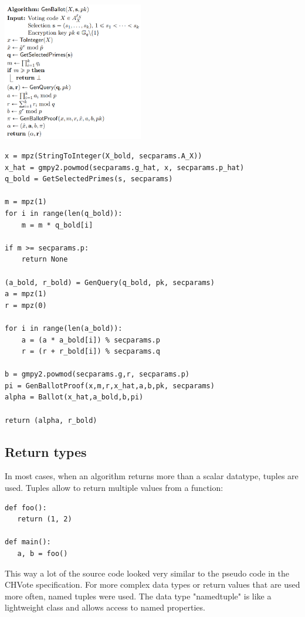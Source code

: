 \begin{multicols}{2}
\includegraphics[width=0.46\textwidth]{assets/genballot.png}
\columnbreak
\begin{verbatim}
x = mpz(StringToInteger(X_bold, secparams.A_X))
x_hat = gmpy2.powmod(secparams.g_hat, x, secparams.p_hat)
q_bold = GetSelectedPrimes(s, secparams)

m = mpz(1)
for i in range(len(q_bold)):
    m = m * q_bold[i]

if m >= secparams.p:
    return None

(a_bold, r_bold) = GenQuery(q_bold, pk, secparams)
a = mpz(1)
r = mpz(0)

for i in range(len(a_bold)):
    a = (a * a_bold[i]) % secparams.p
    r = (r + r_bold[i]) % secparams.q

b = gmpy2.powmod(secparams.g,r, secparams.p)
pi = GenBallotProof(x,m,r,x_hat,a,b,pk, secparams)
alpha = Ballot(x_hat,a_bold,b,pi)

return (alpha, r_bold)
\end{verbatim}
\end{multicols}

\subsection{Return types}
In most cases, when an algorithm returns more than a scalar datatype, tuples are used. Tuples allow to return multiple values from a function:

\begin{verbatim}
def foo():
   return (1, 2)

def main():
   a, b = foo()
\end{verbatim}

This way a lot of the source code looked very similar to the pseudo code in the CHVote specification. For more complex data types or return values that are used more often, named tuples were used. The data type "namedtuple" is like a lightweight class and allows access to named properties.

